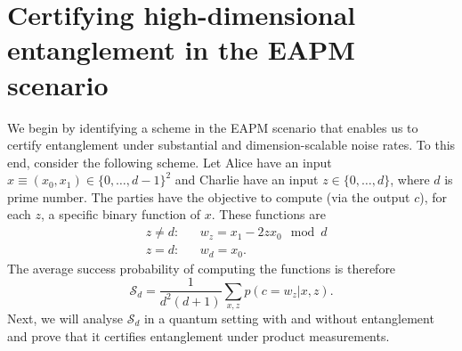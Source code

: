 \documentclass[aps,superscriptaddress,twocolumn,twoside,floatfix,pra,nofootinbib,a4paper]{revtex4-2}
\begin{document}
\section{Certifying high-dimensional entanglement in the EAPM scenario}\label{sec1}
We begin by identifying a scheme in the EAPM scenario that enables us to certify entanglement under substantial and dimension-scalable noise rates. To this end, consider the following scheme. Let Alice have an input $x\equiv (x_0,x_1)\in\{0,\ldots,d-1\}^2$ and Charlie have an input $z\in\{0,\ldots,d\}$, where $d$ is prime number. The parties have the objective to compute (via the output $c$), for each $z$, a specific binary function of $x$. These functions are 
\begin{align}\nonumber
&z\neq d:  &&w_z=x_1-2zx_0 \mod{d} \\\label{wincond1}
&z=d: && w_d=x_0.
\end{align}
The average success probability of computing the functions  is therefore 
\begin{equation}\label{aspS}
\mathcal{S}_d=\frac{1}{d^2(d+1)}\sum_{x,z}p(c=w_z|x,z).
\end{equation}
Next, we will analyse $\mathcal{S}_d$ in a quantum setting with and without entanglement and prove that it certifies entanglement under product measurements.
\end{document}
